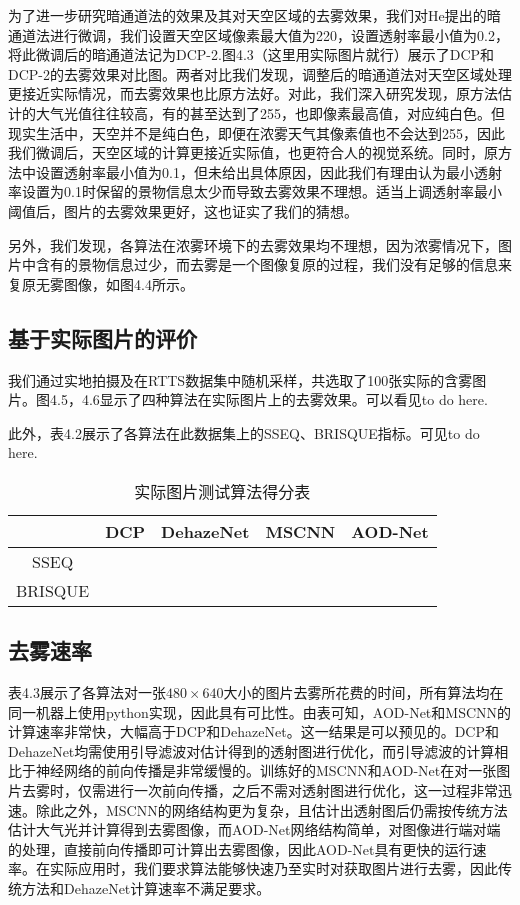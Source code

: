 \documentclass[a4paper, 12pt, oneside]{report}
\begin{document}
{为了进一步研究暗通道法的效果及其对天空区域的去雾效果，我们对He提出的暗通道法进行微调，我们设置天空区域像素最大值为220，设置透射率最小值为0.2，将此微调后的暗通道法记为DCP-2.图4.3（这里用实际图片就行）展示了DCP和DCP-2的去雾效果对比图。两者对比我们发现，调整后的暗通道法对天空区域处理更接近实际情况，而去雾效果也比原方法好。对此，我们深入研究发现，原方法估计的大气光值往往较高，有的甚至达到了255，也即像素最高值，对应纯白色。但现实生活中，天空并不是纯白色，即便在浓雾天气其像素值也不会达到255，因此我们微调后，天空区域的计算更接近实际值，也更符合人的视觉系统。同时，原方法中设置透射率最小值为0.1，但未给出具体原因，因此我们有理由认为最小透射率设置为0.1时保留的景物信息太少而导致去雾效果不理想。适当上调透射率最小阈值后，图片的去雾效果更好，这也证实了我们的猜想。

另外，我们发现，各算法在浓雾环境下的去雾效果均不理想，因为浓雾情况下，图片中含有的景物信息过少，而去雾是一个图像复原的过程，我们没有足够的信息来复原无雾图像，如图4.4所示。

\subsection{基于实际图片的评价\quad}
我们通过实地拍摄及在RTTS数据集中随机采样，共选取了100张实际的含雾图片。图4.5，4.6显示了四种算法在实际图片上的去雾效果。可以看见to do here.

此外，表4.2展示了各算法在此数据集上的SSEQ、BRISQUE指标。可见to do here.
\begin{table}[htbp]
  \centering
  \caption{实际图片测试算法得分表}
    \begin{tabular}{c|c|c|c|c}
    \hline
         & DCP    & DehazeNet  & MSCNN    & AOD-Net  \\
    \hline
    SSEQ &   &  &     &  \\
    \hline
     BRISQUE     &       &       &   & \\
     \hline
  
    \end{tabular}%
  \label{tab:4.2}%
\end{table}%

\subsection{去雾速率\quad}
表4.3展示了各算法对一张$480 \times 640$大小的图片去雾所花费的时间，所有算法均在同一机器上使用python实现，因此具有可比性。由表可知，AOD-Net和MSCNN的计算速率非常快，大幅高于DCP和DehazeNet。这一结果是可以预见的。DCP和DehazeNet均需使用引导滤波对估计得到的透射图进行优化，而引导滤波的计算相比于神经网络的前向传播是非常缓慢的。训练好的MSCNN和AOD-Net在对一张图片去雾时，仅需进行一次前向传播，之后不需对透射图进行优化，这一过程非常迅速。除此之外，MSCNN的网络结构更为复杂，且估计出透射图后仍需按传统方法估计大气光并计算得到去雾图像，而AOD-Net网络结构简单，对图像进行端对端的处理，直接前向传播即可计算出去雾图像，因此AOD-Net具有更快的运行速率。在实际应用时，我们要求算法能够快速乃至实时对获取图片进行去雾，因此传统方法和DehazeNet计算速率不满足要求。

}
\end{document}
